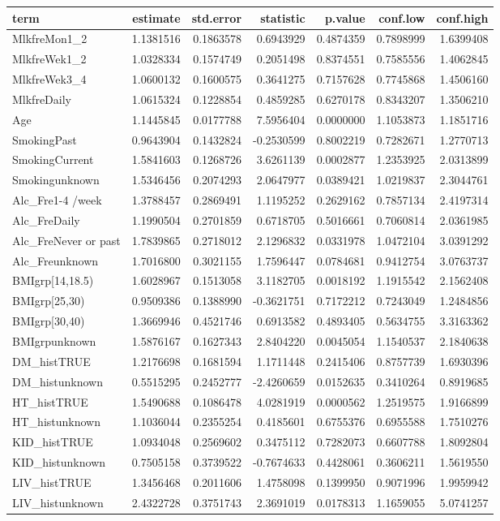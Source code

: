 \documentclass[]{article}
\begin{document}
\begin{longtable}[]{@{}lrrrrrr@{}}
\toprule
term & estimate & std.error & statistic & p.value & conf.low &
conf.high\tabularnewline
\midrule
\endhead
MlkfreMon1\_2 & 1.1381516 & 0.1863578 & 0.6943929 & 0.4874359 &
0.7898999 & 1.6399408\tabularnewline
MlkfreWek1\_2 & 1.0328334 & 0.1574749 & 0.2051498 & 0.8374551 &
0.7585556 & 1.4062845\tabularnewline
MlkfreWek3\_4 & 1.0600132 & 0.1600575 & 0.3641275 & 0.7157628 &
0.7745868 & 1.4506160\tabularnewline
MlkfreDaily & 1.0615324 & 0.1228854 & 0.4859285 & 0.6270178 & 0.8343207
& 1.3506210\tabularnewline
Age & 1.1445845 & 0.0177788 & 7.5956404 & 0.0000000 & 1.1053873 &
1.1851716\tabularnewline
SmokingPast & 0.9643904 & 0.1432824 & -0.2530599 & 0.8002219 & 0.7282671
& 1.2770713\tabularnewline
SmokingCurrent & 1.5841603 & 0.1268726 & 3.6261139 & 0.0002877 &
1.2353925 & 2.0313899\tabularnewline
Smokingunknown & 1.5346456 & 0.2074293 & 2.0647977 & 0.0389421 &
1.0219837 & 2.3044761\tabularnewline
Alc\_Fre1-4 /week & 1.3788457 & 0.2869491 & 1.1195252 & 0.2629162 &
0.7857134 & 2.4197314\tabularnewline
Alc\_FreDaily & 1.1990504 & 0.2701859 & 0.6718705 & 0.5016661 &
0.7060814 & 2.0361985\tabularnewline
Alc\_FreNever or past & 1.7839865 & 0.2718012 & 2.1296832 & 0.0331978 &
1.0472104 & 3.0391292\tabularnewline
Alc\_Freunknown & 1.7016800 & 0.3021155 & 1.7596447 & 0.0784681 &
0.9412754 & 3.0763737\tabularnewline
BMIgrp{[}14,18.5) & 1.6028967 & 0.1513058 & 3.1182705 & 0.0018192 &
1.1915542 & 2.1562408\tabularnewline
BMIgrp{[}25,30) & 0.9509386 & 0.1388990 & -0.3621751 & 0.7172212 &
0.7243049 & 1.2484856\tabularnewline
BMIgrp{[}30,40) & 1.3669946 & 0.4521746 & 0.6913582 & 0.4893405 &
0.5634755 & 3.3163362\tabularnewline
BMIgrpunknown & 1.5876167 & 0.1627343 & 2.8404220 & 0.0045054 &
1.1540537 & 2.1840638\tabularnewline
DM\_histTRUE & 1.2176698 & 0.1681594 & 1.1711448 & 0.2415406 & 0.8757739
& 1.6930396\tabularnewline
DM\_histunknown & 0.5515295 & 0.2452777 & -2.4260659 & 0.0152635 &
0.3410264 & 0.8919685\tabularnewline
HT\_histTRUE & 1.5490688 & 0.1086478 & 4.0281919 & 0.0000562 & 1.2519575
& 1.9166899\tabularnewline
HT\_histunknown & 1.1036044 & 0.2355254 & 0.4185601 & 0.6755376 &
0.6955588 & 1.7510276\tabularnewline
KID\_histTRUE & 1.0934048 & 0.2569602 & 0.3475112 & 0.7282073 &
0.6607788 & 1.8092804\tabularnewline
KID\_histunknown & 0.7505158 & 0.3739522 & -0.7674633 & 0.4428061 &
0.3606211 & 1.5619550\tabularnewline
LIV\_histTRUE & 1.3456468 & 0.2011606 & 1.4758098 & 0.1399950 &
0.9071996 & 1.9959942\tabularnewline
LIV\_histunknown & 2.4322728 & 0.3751743 & 2.3691019 & 0.0178313 &
1.1659055 & 5.0741257\tabularnewline

\end{longtable}
\end{document}
